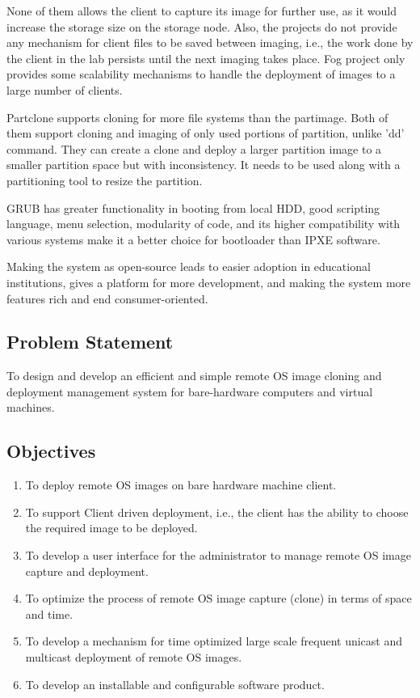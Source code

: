 \documentclass[a4paper,12pt]{article}
\begin{document}
None of them allows the client to capture its image for further use, as it would increase the storage size on the storage node. Also,  the projects do not provide any mechanism for client files to be saved between imaging, i.e., the work done by the client in the lab persists until the next imaging takes place. Fog project only provides some scalability mechanisms to handle the deployment of images to a large number of clients.  

Partclone supports cloning for more file systems than the partimage. Both of them support cloning and imaging of only used portions of partition, unlike 'dd' command. They can create a clone and deploy a larger partition image to a smaller partition space but with inconsistency. It needs to be used along with a partitioning tool to resize the partition.

GRUB has greater functionality in booting from local HDD, good scripting language, menu selection, modularity of code, and its higher compatibility with various systems make it a better choice for bootloader than IPXE software.

 Making the system as open-source leads to easier adoption in educational institutions, gives a platform for more development, and making the system more features rich and end consumer-oriented. 

\subsection{Problem Statement}
To design and develop an efficient and simple remote OS image cloning and deployment management system for bare-hardware computers and virtual machines.
\subsection{Objectives}
\begin{enumerate}
\item To deploy remote OS images on bare hardware machine client.
\item To support Client driven deployment, i.e., the client has the ability to choose the required image to be deployed.
\item To develop a user interface for the administrator to manage remote OS image capture and deployment.
\item To optimize the process of remote OS image capture (clone) in terms of space and time.
\item To develop a mechanism for time optimized large scale frequent unicast and multicast  deployment of remote OS images.
\item To develop an installable and configurable software product.
\end{enumerate}
\end{document}
